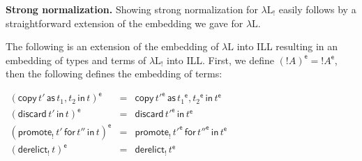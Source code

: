 \documentclass{llncs}
\newcommand{\Lnt}[1]{\mathit{#1}}
\newcommand{\Lsym}[1]{#1}
\begin{document}
\textbf{Strong normalization.} Showing strong normalization for
$\lambda\text{L}_!$ easily follows by a straightforward extension of
the embedding we gave for $\lambda\text{L}$.
\begin{definition}
  \label{def:embed-lambda-L!-in-ILL}
  The following is an extension of the embedding of $\lambda\text{L}$
  into ILL resulting in an embedding of types and terms of
  $\lambda\text{L}_!$ into ILL. First, we define $ \Lsym{(}   !  \Lnt{A}   \Lsym{)} ^{\mathsf{e} }  =  !    \Lnt{A} ^{\mathsf{e} }   $, then the following defines the embedding of terms:
  \begin{center} \small
    \begin{math}
      \begin{array}{rlllllllllllllllllll}        
          (   \mathsf{copy}\, \Lnt{t'} \,\mathsf{as}\, \Lnt{t_{{\mathrm{1}}}} , \Lnt{t_{{\mathrm{2}}}} \,\mathsf{in}\, \Lnt{t}   )  ^{\mathsf{e} }  & = &  \mathsf{copy}\,  \Lnt{t'} ^{\mathsf{e} }  \,\mathsf{as}\,  \Lnt{t_{{\mathrm{1}}}} ^{\mathsf{e} }  ,  \Lnt{t_{{\mathrm{2}}}} ^{\mathsf{e} }  \,\mathsf{in}\,   \Lnt{t} ^{\mathsf{e} }   \\
          (   \mathsf{discard}\, \Lnt{t'} \,\mathsf{in}\, \Lnt{t}   )  ^{\mathsf{e} }  & = &  \mathsf{discard}\,  \Lnt{t'} ^{\mathsf{e} }  \,\mathsf{in}\,   \Lnt{t} ^{\mathsf{e} }   \\
          (   \mathsf{promote}_!\, \Lnt{t'} \,\mathsf{for}\, \Lnt{t''} \,\mathsf{in}\, \Lnt{t}   )  ^{\mathsf{e} }  & = &  \mathsf{promote}_!\,  \Lnt{t'} ^{\mathsf{e} }  \,\mathsf{for}\,  \Lnt{t''} ^{\mathsf{e} }  \,\mathsf{in}\,   \Lnt{t} ^{\mathsf{e} }   \\
          (   \mathsf{derelict}_!\, \Lnt{t}   )  ^{\mathsf{e} }  & = &  \mathsf{derelict}_!\,   \Lnt{t} ^{\mathsf{e} }   \\
      \end{array}
    \end{math}
  \end{center}
\end{definition}
\end{document}
